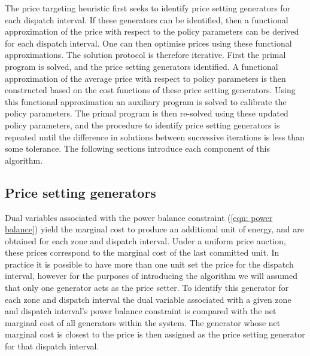 \documentclass{article}
\begin{document}
The price targeting heuristic first seeks to identify price setting generators for each dispatch interval. If these generators can be identified, then a functional approximation of the price with respect to the policy parameters can be derived for each dispatch interval. One can then optimise prices using these functional approximations. The solution protocol is therefore iterative. First the primal program is solved, and the price setting generators identified. A functional approximation of the average price with respect to policy parameters is then constructed based on the cost functions of these price setting generators. Using this functional approximation an auxiliary program is solved to calibrate the policy parameters. The primal program is then re-solved using these updated policy parameters, and the procedure to identify price setting generators is repeated until the difference in solutions between successive iterations is less than some tolerance. The following sections introduce each component of this algorithm.

\subsection{Price setting generators}
Dual variables associated with the power balance constraint (\ref{eqn: power balance}) yield the marginal cost to produce an additional unit of energy, and are obtained for each zone and dispatch interval. Under a uniform price auction, these prices correspond to the marginal cost of the last committed unit. In practice it is possible to have more than one unit set the price for the dispatch interval, however for the purposes of introducing the algorithm we will assumed that only one generator acts as the price setter. To identify this generator for each zone and dispatch interval the dual variable associated with a given zone and dispatch interval's power balance constraint is compared with the net marginal cost of all generators within the system. The generator whose net marginal cost is closest to the price is then assigned as the price setting generator for that dispatch interval. 

\end{document}
